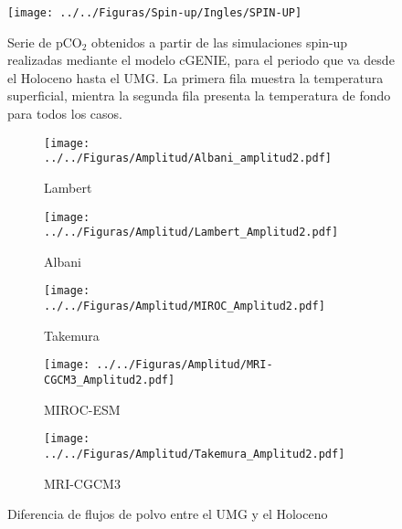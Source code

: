 

\begin{figure}[H]
\centering
 \texttt{[image: ../../Figuras/Spin-up/Ingles/SPIN-UP]}
 \caption[Simulación spin-up]{Serie de pCO$_2$ obtenidos a partir de las simulaciones spin-up realizadas mediante el modelo cGENIE, para el periodo que va desde el Holoceno hasta el UMG. La primera fila muestra la temperatura superficial, mientra la segunda fila presenta la temperatura de fondo para todos los casos.}
  \label{fig:SPIN-UP}
\end{figure}
\newpage

 \begin{figure}[H]
        \begin{subfigure}[b]{0.55\textwidth}
                \texttt{[image: ../../Figuras/Amplitud/Albani\_amplitud2.pdf]}
                \caption{Lambert}
                \label{fig:L}
        \end{subfigure}%
        \begin{subfigure}[b]{0.55\textwidth}
                \texttt{[image: ../../Figuras/Amplitud/Lambert\_Amplitud2.pdf]}
                \caption{Albani}
                \label{fig:A}
        \end{subfigure}%
        
        \begin{subfigure}[b]{0.55\textwidth}
                \texttt{[image: ../../Figuras/Amplitud/MIROC\_Amplitud2.pdf]}
                \caption{Takemura}
                \label{fig:T}
        \end{subfigure}%
        \begin{subfigure}[b]{0.55\textwidth}
                \texttt{[image: ../../Figuras/Amplitud/MRI-CGCM3\_Amplitud2.pdf]}
                \caption{MIROC-ESM}
                \label{fig:MI}
        \end{subfigure}
        
        \begin{subfigure}[b]{0.55\textwidth}
                \texttt{[image: ../../Figuras/Amplitud/Takemura\_Amplitud2.pdf]}
                \caption{MRI-CGCM3}
                \label{fig:MR}
        \end{subfigure}
        \caption[Amplitud flujos de polvo]{Diferencia de flujos de polvo entre el UMG y el Holoceno}\label{fig:Amp}
\end{figure}

\newpage

